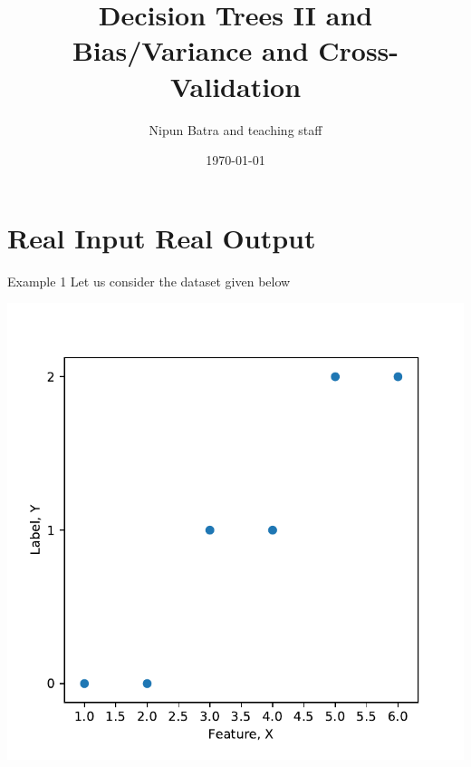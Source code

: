 \documentclass{beamer}
\title{Decision Trees II and Bias/Variance and Cross-Validation}
\date{\today}
\author{Nipun Batra and teaching staff}
\institute{IIT Gandhinagar}
\begin{document}
	\maketitle
	
	




\section{Real Input Real Output}

\begin{frame}{Example 1}
Let us consider the dataset given below
\begin{center}
\includegraphics[scale=0.5]{decision-trees-regression/imgs/dataset}
\end{center}
\end{frame}
\end{document}
